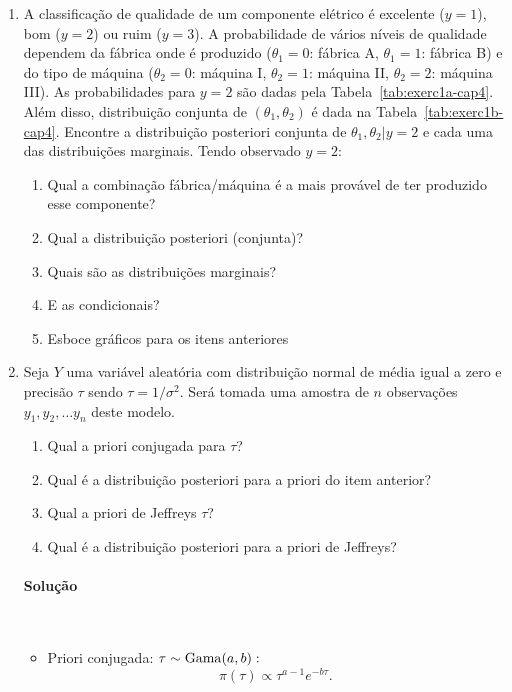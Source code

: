 \documentclass[11pt,a4]{article}\usepackage[]{graphicx}\usepackage[]{xcolor}
\begin{document}
\begin{enumerate}
\item A classificação de qualidade de um componente elétrico é excelente ($y = 1$), bom ($y = 2$) ou ruim ($y = 3$). A probabilidade de vários níveis de qualidade dependem da fábrica onde é produzido ($\theta_1 = 0$: fábrica A, $\theta_1 = 1$: fábrica B) e do tipo de máquina ($\theta_2 = 0$: máquina I, $\theta_2 = 1$: máquina II, $\theta_2 = 2$: máquina III). As probabilidades para $y = 2$ são dadas pela Tabela~\ref{tab:exerc1a-cap4}.
Além disso, distribuição conjunta de $(\theta_1, \theta_2)$ é dada na Tabela~\ref{tab:exerc1b-cap4}.
Encontre a distribuição posteriori conjunta de $\theta_1, \theta_2|y = 2$ e cada uma das distribuições marginais. Tendo observado $y = 2$:
\begin{enumerate}
\item Qual a combinação fábrica/máquina é a mais provável de ter produzido esse componente?
\item Qual a distribuição posteriori (conjunta)?
\item Quais são as distribuições marginais?
\item E as condicionais?  
\item Esboce gráficos para os itens anteriores
\end{enumerate}


\item Seja $Y$ uma variável aleatória com distribuição normal de média igual a zero
  e precisão $\tau$ sendo $\tau = 1/\sigma^2$. Será tomada uma amostra de $n$ observações
  $y_1, y_2, \ldots y_n$ deste modelo.
  \begin{enumerate}
  \item Qual a priori conjugada para $\tau$?
  \item Qual é a distribuição posteriori para a priori do item anterior?
  \item Qual a priori de Jeffreys $\tau$?
  \item Qual é a distribuição posteriori para a priori de Jeffreys?
  \end{enumerate}

\begin{solucao}
\paragraph{\bf Solução} \mbox{} \\
  \begin{itemize}
  \item Priori conjugada: $\tau \sim {\rm Gama}(a, b):$ 
    \[
      \pi(\tau) \propto \tau^{a-1} e^{-b\tau}.
    \]
    

\end{itemize}
\end{solucao}
\end{enumerate}
\end{document}
